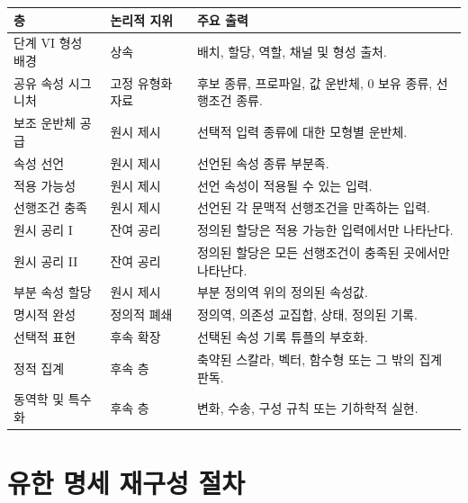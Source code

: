 \documentclass[11pt]{article}
\theoremstyle{definition}
\theoremstyle{remark}
\begin{document}
\begin{tabularx}{\textwidth}{@{}>{\raggedright\arraybackslash}p{}>{\raggedright\arraybackslash}p{}X@{}}
\toprule
층 & 논리적 지위 & 주요 출력\\
\midrule
단계 VI 형성 배경 & 상속 & 배치, 할당, 역할, 채널 및 형성 출처.\\
공유 속성 시그니처 & 고정 유형화 자료 & 후보 종류, 프로파일, 값 운반체, 0 보유 종류, 선행조건 종류.\\
보조 운반체 공급 & 원시 제시 & 선택적 입력 종류에 대한 모형별 운반체.\\
속성 선언 & 원시 제시 & 선언된 속성 종류 부분족.\\
적용 가능성 & 원시 제시 & 선언 속성이 적용될 수 있는 입력.\\
선행조건 충족 & 원시 제시 & 선언된 각 문맥적 선행조건을 만족하는 입력.\\
원시 공리 I & 잔여 공리 & 정의된 할당은 적용 가능한 입력에서만 나타난다.\\
원시 공리 II & 잔여 공리 & 정의된 할당은 모든 선행조건이 충족된 곳에서만 나타난다.\\
부분 속성 할당 & 원시 제시 & 부분 정의역 위의 정의된 속성값.\\
명시적 완성 & 정의적 폐쇄 & 정의역, 의존성 교집합, 상태, 정의된 기록.\\
선택적 표현 & 후속 확장 & 선택된 속성 기록 튜플의 부호화.\\
정적 집계 & 후속 층 & 축약된 스칼라, 벡터, 함수형 또는 그 밖의 집계 판독.\\
동역학 및 특수화 & 후속 층 & 변화, 수송, 구성 규칙 또는 기하학적 실현.\\
\bottomrule
\end{tabularx}

\section{유한 명세 재구성 절차}
\label{app:finite-protocol}
\end{document}
